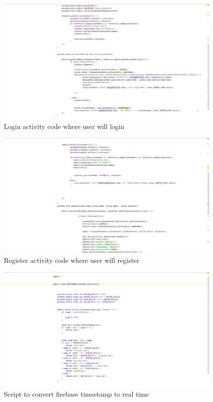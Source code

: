 \noindent
\begin{figure}[!ht]
	\centering
	\includegraphics[scale=0.3]{login.png}
	\caption{\label{img12} Login activity code where user will login }
\end{figure}

\noindent
\begin{figure}[!ht]
	\centering
	\includegraphics[scale=0.3]{register.png}
	\caption{\label{img13} Register activity code where user will register}
\end{figure}

\noindent
\begin{figure}[!ht]
	\centering
	\includegraphics[scale=0.3]{time-convert.png}
	\caption{\label{img14} Script to convert firebase timestamp to real time }
\end{figure}

